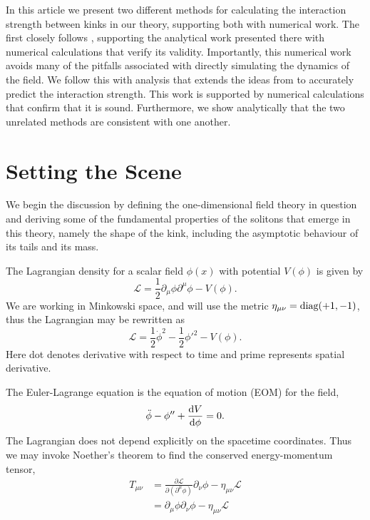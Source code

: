 \documentclass[11pt, oneside]{article}  	%
\numberwithin{equation}{section}
\newcommand{\drv}{\ensuremath{\textup{d}}}
\begin{document}
In this article we present two different methods for calculating the interaction strength between kinks in our theory, supporting both with numerical work. The first closely follows \cite{manton_forces_2019}, supporting the analytical work presented there with numerical calculations that verify its validity. Importantly, this numerical work avoids many of the pitfalls associated with directly simulating the dynamics of the field. We follow this with analysis that extends the ideas from \cite{gonzalez_solitary_1987,gonzalez_kinks_1989} to accurately predict the interaction strength. This work is supported by numerical calculations that confirm that it is sound. Furthermore, we show analytically that the two unrelated methods are consistent with one another.

\section{Setting the Scene}\label{section:set_scene}
We begin the discussion by defining the one-dimensional field theory in question and deriving some of the fundamental properties of the solitons that emerge in this theory, namely the shape of the kink, including the asymptotic behaviour of its tails and its mass.\par
The Lagrangian density for a scalar field $\phi(x)$ with potential $V(\phi)$ is given by
\begin{equation}\label{lagrangian}
    \mathcal{L} = \frac{1}{2} \partial_\mu \phi \partial^\mu \phi  - V(\phi).
\end{equation} 
We are working in Minkowski space, and will use the metric $\eta_{\mu\nu} = \textup{diag}(+1,-1)$, thus the Lagrangian may be rewritten as
\begin{equation}
    \mathcal{L} = \frac{1}{2}\dot{\phi}^2 -  \frac{1}{2}{\phi'}^2   - V(\phi).
\end{equation}
Here dot denotes derivative with respect to time and prime represents spatial derivative.\par
The Euler-Lagrange equation is the equation of motion (EOM) for the field,
\begin{equation}\label{EOM}
    \ddot{\phi} - {\phi}'' + \frac{\drv V}{\drv \phi} = 0.
\end{equation}
The Lagrangian does not depend explicitly on the spacetime coordinates. Thus we may invoke Noether's theorem to find the conserved energy-momentum tensor,
\begin{align}
    T_{\mu \nu} &= \frac{\partial \mathcal{L}}{\partial \left (\partial^\mu \mathcal{\phi}\right )} \partial_\nu\phi - \eta_{\mu\nu} \mathcal{L}  \nonumber \\
    &=  \partial_\mu\phi \partial_\nu\phi - \eta_{\mu\nu} \mathcal{L}  
\end{align}
\end{document}

